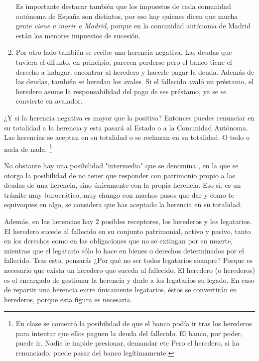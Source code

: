 \documentclass[nochap,palatino,shortheader]{apuntes}
\newcommand{\study}[1]{#1} \newcommand{\substudy}[1]{#1}
\begin{document}
\begin{enumerate}
Es importante destacar también que \substudy{los impuestos de cada comunidad autónoma de España son distintos}, por eso hay quienes dicen que mucha gente \textit{viene a morir a Madrid}, porque en la comunidad autónoma de Madrid están los menores impuestos de sucesión.


\item Por otro lado también se recibe una \study{herencia negativa}.
Las \study{deudas} que tuviera el difunto, en principio, parecen perderse pero el banco tiene el derecho a indagar, encontrar al heredero y hacerle pagar la deuda.
Además de las deudas, también se heredan los \study{avales}.
Si el fallecido avaló un préstamo, el heredero asume la responsabilidad del pago de ses préstamo, ya se se convierte en avalador.

\end{enumerate}

¿Y si la herencia negativa es mayor que la positiva? Entonces puedes renunciar en su totalidad a la herencia y esta pasará al Estado o a la Comunidad Autónoma. \substudy{Las herencias se aceptan en su totalidad o se rechazan en su totalidad}. O todo o nada de nada.
\footnote{En clase se comentó la posibilidad de que el banco podía ir tras los herederos para intentar que ellos paguen la deuda del fallecido. El banco, por poder, puede ir. Nadie le impide presionar, demandar etc Pero el heredero, si ha renunciado, puede pasar del banco legítimamente.}

No obstante hay una posibilidad "intermedia" que se denomina , en la que se otorga la posibilidad de no tener que responder con patrimonio propio a las deudas de una herencia, sino únicamente con la propia herencia.
Eso sí, es un trámite muy burocrático, muy chungo con muchos pasos que dar y como te equivoques en algo, se considera que has aceptado la herencia en su totalidad.

Además, en las herencias hay 2 posibles receptores, los herederos y los legatarios.
El \substudy{heredero sucede al fallecido} en su conjunto patrimonial, activo y pasivo, \substudy{tanto en los derechos como en las obligaciones} que no se extingan por su muerte, mientras que el \substudy{legatario sólo} lo hace en \substudy{bienes o derechos} determinados por el fallecido.
Tras esto, pensarás ¿Por qué no ser todos legatarios siempre?
Porque es \substudy{necesario que exista un heredero} que suceda al fallecido. El heredero (o herederos) es el encargado de gestionar la herencia y darle a los legatarios su legado.
En caso de repartir una herencia entre únicamente legatarios, éstos se convertirán en herederos, porque esta figura es necesaria.
\end{document}
